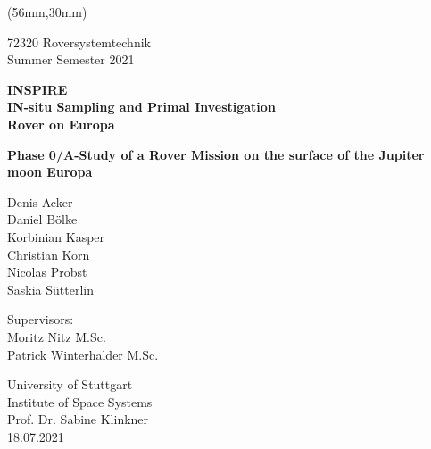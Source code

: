 %
%

\begin{titlepage}
	
	\begin{textblock*}{117mm}(56mm,30mm)
		
		\begin{center}
		
		
			72320 Roversystemtechnik \\
			Summer Semester 2021
			
			
			\vspace{20mm}
			
			\large \textbf{INSPIRE} \\ 
			\vspace{5mm}
			\large \textbf{IN-situ Sampling and Primal Investigation \\ Rover on Europa}
			
			\vspace{20mm}
			
			\large \textbf{Phase 0/A-Study of a Rover Mission on the surface of the Jupiter moon Europa}
			
			\vspace{30mm}
			
			\normalsize 
			Denis Acker \\
			Daniel Bölke \\
			Korbinian Kasper \\
			Christian Korn \\
			Nicolas Probst \\
			Saskia Sütterlin \\
			
			
			\vspace{40mm}
			
			Supervisors: \\
			Moritz Nitz M.Sc. \\
			Patrick Winterhalder M.Sc. 
			
			\vspace{20mm}
			
			University of Stuttgart \\
			Institute of Space Systems \\
			Prof. Dr. Sabine Klinkner \\
			18.07.2021
			
		\end{center}
	
	\end{textblock*}
	
\end{titlepage}



